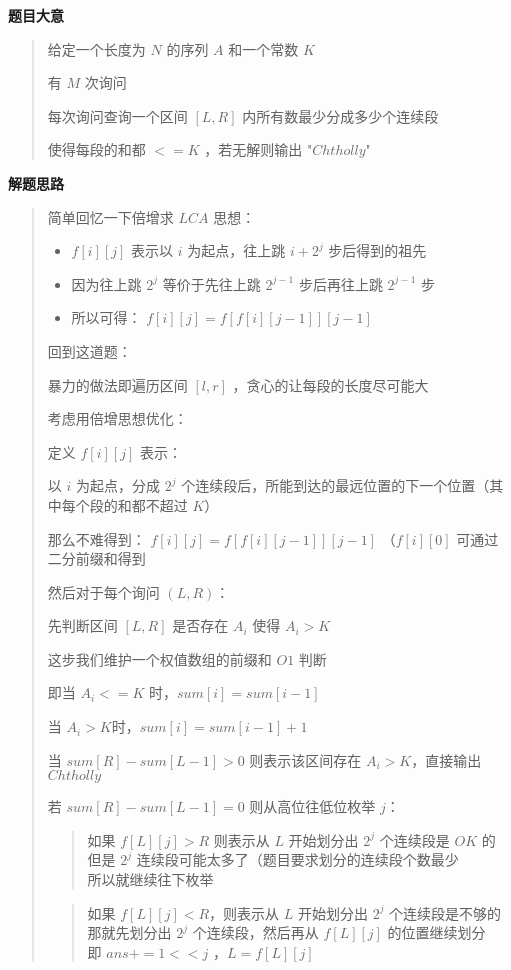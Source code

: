 \documentclass[E:/GsjzTle/main/main.tex]{subfiles}
\begin{document}
	
	\textbf{题目大意}
	
	\begin{quote}
		给定一个长度为 \(N\) 的序列 \(A\) 和一个常数 \(K\)
		
		有 \(M\) 次询问
		
		每次询问查询一个区间 \([L , R]\) 内所有数最少分成多少个连续段
		
		使得每段的和都 \(<= K\) ，若无解则输出 "\(Chtholly\)"
	\end{quote}
	
	\textbf{解题思路}
	
	\begin{quote}
		简单回忆一下倍增求 \(LCA\) 思想：
		
		\begin{itemize}
			\item
			\(f[i][j]\) 表示以 \(i\) 为起点，往上跳 \(i + 2^j\) 步后得到的祖先
			\item
			因为往上跳 \(2^j\) 等价于先往上跳 \(2^{j - 1}\) 步后再往上跳
			\(2^{j - 1}\) 步
			\item
			所以可得： \(f[i][j] = f[f[i][j - 1]][j - 1]\)
		\end{itemize}
		
		回到这道题：
		
		暴力的做法即遍历区间 \([l,r]\) ，贪心的让每段的长度尽可能大
		
		考虑用倍增思想优化：
		
		定义 \(f[i][j]\) 表示：
		
		以 \(i\) 为起点，分成 \(2 ^ j\)
		个连续段后，所能到达的最远位置的下一个位置（其中每个段的和都不超过
		\(K\)）
		
		那么不难得到： \(f[i][j] = f[f[i][j - 1]][j - 1]\) （\(f[i][0]\)
		可通过二分前缀和得到
		
		然后对于每个询问 \((L , R)\)：
		
		先判断区间 \([L,R]\) 是否存在 \(A_i\) 使得 \(A_i > K\)
		
		这步我们维护一个权值数组的前缀和 \(O1\) 判断
		
		即当 \(A_i <= K\) 时，\(sum[i] = sum[i - 1]\)
		
		当 \(A_i > K\)时，\(sum[i] = sum[i - 1] + 1\)
		
		当 \(sum[R] - sum[L - 1] > 0\) 则表示该区间存在 \(A_i > K\)，直接输出
		\(Chtholly\)
		
		若 \(sum[R] - sum[L - 1] = 0\) 则从高位往低位枚举 \(j\)：
		
		\begin{quote}
			如果 \(f[L][j] > R\) 则表示从 \(L\) 开始划分出 \(2^j\) 个连续段是 \(OK\)
			的\\
			但是 \(2^j\) 连续段可能太多了（题目要求划分的连续段个数最少\\
			所以就继续往下枚举
		\end{quote}
		
		\begin{quote}
			如果 \(f[L][j] < R\)，则表示从 \(L\) 开始划分出 \(2^j\)
			个连续段是不够的\\
			那就先划分出 \(2^j\) 个连续段，然后再从 \(f[L][j]\) 的位置继续划分\\
			即 \(ans += 1 << j\) ，\(L = f[L][j]\)
		\end{quote}
	\end{quote}
	
\end{document}
